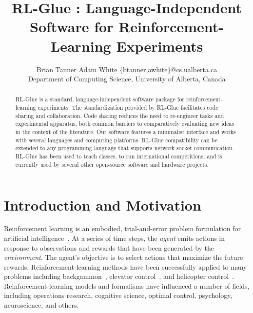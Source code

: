 \documentclass[twoside,11pt]{article}
\begin{document}
\title{RL-Glue : Language-Independent Software for Reinforcement-Learning Experiments}


\author{\name Brian Tanner \AND Adam White  \email \{btanner,awhite\}@cs.ualberta.ca \\
       \addr Department of Computing Science, University of Alberta, Canada}


\maketitle

\begin{abstract}
RL-Glue is a standard, language-independent software package for reinforcement-learning experiments.  The standardization provided by RL-Glue facilitates code sharing and collaboration.  Code sharing reduces the need to re-engineer tasks and experimental apparatus, both common barriers to comparatively evaluating new ideas in the context of the literature.  Our software features a minimalist interface and works with several languages and computing platforms. RL-Glue compatibility can be extended to any programming language that supports network socket communication. RL-Glue has been used to teach classes, to run international competitions, and is currently used by several other open-source software and hardware projects.
\end{abstract}

\section{Introduction and Motivation}
Reinforcement learning is an embodied, trial-and-error problem formulation for artificial intelligence~\citep{rlbook, rlsurvey,ndp}.  At a series of time steps, the {\it agent} emits actions in response to observations and rewards that have been generated by the {\it environment}.  The agent's objective is to select actions that maximize the future rewards.  Reinforcement-learning methods have been successfully applied to many problems including %
  backgammon~\citep{tesauro:nc94}, elevator control~\citep{crites:mlj98},
and helicopter control~\citep{ng:iser04}.  
Reinforcement-learning models and formalisms have influenced a number of fields, including operations research, cognitive science, optimal control, psychology, neuroscience, and others.
\end{document}
